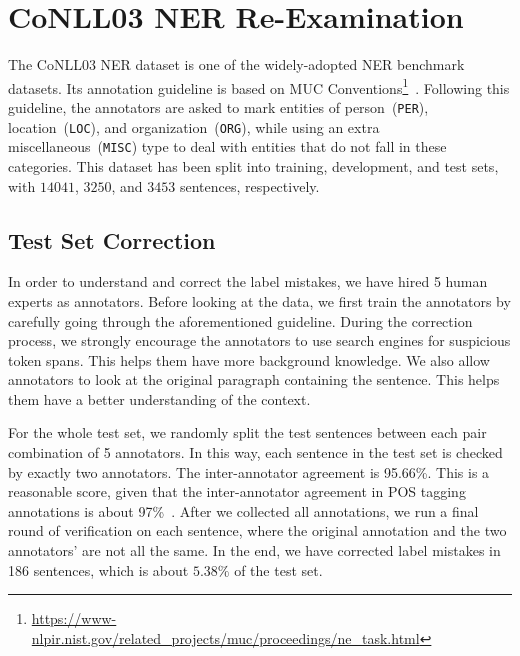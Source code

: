 \documentclass[11pt,a4paper]{article}
\begin{document}
\section{CoNLL03 NER Re-Examination}\label{sec:correction}
    
    The CoNLL03 NER dataset is one of the widely-adopted NER benchmark datasets. 
    Its annotation guideline is based on MUC Conventions\footnote{\url{https://www-nlpir.nist.gov/related_projects/muc/proceedings/ne_task.html}}~\cite{sang2003introduction}.
    Following this guideline, the annotators are asked to mark entities of person~(\texttt{PER}), location~(\texttt{LOC}), and organization~(\texttt{ORG}), while using an extra miscellaneous~(\texttt{MISC}) type to deal with entities that do not fall in these categories.
    This dataset has been split into training, development, and test sets, with $14041$, $3250$, and $3453$ sentences, respectively.

    \subsection{Test Set Correction}
        In order to understand and correct the label mistakes, we have hired 5 human experts as annotators.
        Before looking at the data, we first train the annotators by carefully going through the aforementioned guideline.
        During the correction process, we strongly encourage the annotators to use search engines for suspicious token spans.
        This helps them have more background knowledge.
        We also allow annotators to look at the original paragraph containing the sentence.
        This helps them have a better understanding of the context.
        
        For the whole test set, we randomly split the test sentences between each pair combination of 5 annotators. 
        In this way, each sentence in the test set is checked by exactly two annotators. 
        The inter-annotator agreement is 95.66\%.
        This is a reasonable score, given that the inter-annotator agreement in POS tagging annotations is about 97\%~\cite{manning2011part}.
After we collected all annotations, we run a final round of verification on each sentence, where the original annotation and the two annotators' are not all the same.
        In the end, we have corrected label mistakes in 186 sentences, which is about $5.38\%$ of the test set.
        
\end{document}
